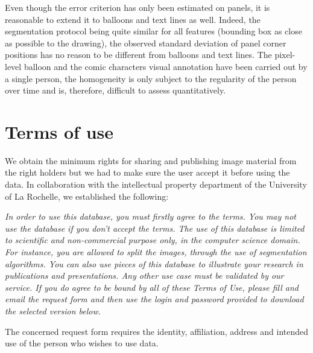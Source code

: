 Even though the error criterion has only been estimated on panels, it is reasonable to extend it to balloons and text lines as well.
Indeed, the segmentation protocol being quite similar for all features (bounding box as close as possible to the drawing), the observed standard deviation of panel corner positions has no reason to be different from balloons and text lines.
The pixel-level balloon and the comic characters visual annotation have been carried out by a single person, the homogeneity is only subject to the regularity of the person over time and is, therefore, difficult to assess quantitatively.


\section{Terms of use} %
\label{sub:term_of_use}
We obtain the minimum rights for sharing and publishing image material from the right holders but we had to make sure the user accept it before using the data.
In collaboration with the intellectual property department of the University of La Rochelle, we established the following:

\textit{In order to use this database, you must firstly agree to the terms.
You may not use the database if you don't accept the terms.
The use of this database is limited to scientific and non-commercial purpose only, in the computer science domain.
For instance, you are allowed to split the images, through the use of segmentation algorithms.
You can also use pieces of this database to illustrate your research in publications and presentations.
Any other use case must be validated by our service.
If you do agree to be bound by all of these Terms of Use, please fill and email the request form and then use the login and password provided to download the selected version below.}

The concerned request form requires the identity, affiliation, address and intended use of the person who wishes to use data.

